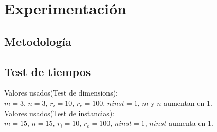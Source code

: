 \section{Experimentación}

\subsection{Metodología}

\subsection{Test de tiempos}

Valores usados(Test de dimensions): \\
$m = 3$, $n = 3$, $r_i = 10$, $r_e = 100$, $ninst = 1$, $m$ y $n$ aumentan en 1. \\
Valores usados(Test de instancias): \\
$m = 15$, $n = 15$, $r_i = 10$, $r_e = 100$, $ninst = 1$, $ninst$ aumenta en 1. \\


